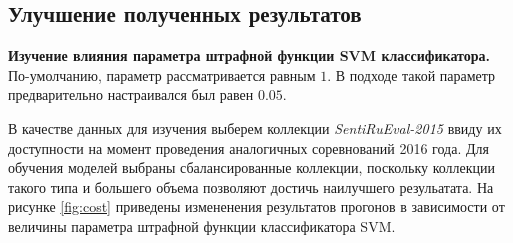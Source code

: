 \subsection{Улучшение полученных результатов}

{\bf Изучение влияния параметра штрафной функции SVM классификатора.}
По-умолчанию, параметр рассматривается равным $1$. В подходе \cite{modernApproach}
такой параметр предварительно настраивался был равен $0.05$.

В качестве данных для изучения выберем коллекции {\it SentiRuEval-2015} ввиду их
доступности на момент проведения аналогичных соревнований 2016 года. Для
обучения моделей выбраны сбалансированные коллекции, поскольку коллекции такого
типа и большего объема позволяют достичь наилучшего резульатата. На рисунке
\ref{fig:cost} приведены измененения результатов прогонов в зависимости от
величины параметра штрафной функции классификатора SVM.

